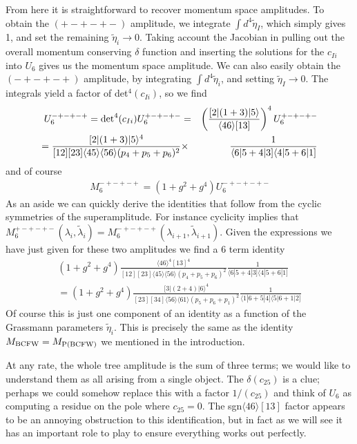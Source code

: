 \documentclass[12pt]{article}
\newcommand{\be}{\begin{eqnarray}}
\newcommand{\ee}{\end{eqnarray}}
\begin{document}
From here it is straightforward to recover momentum space amplitudes. To obtain the $(+-+-+-)$ amplitude, we integrate $\int d^4 \tilde \eta_I$, which simply gives 1, and set the remaining $\tilde \eta_i \to 0$. Taking account the Jacobian in pulling out the overall momentum conserving $\delta$ function and inserting the solutions for the $c_{Ii}$ into $U_6$ gives us the momentum space amplitude. We can also easily obtain the $(-+-+-+)$ amplitude, by integrating $\int d^4 \tilde \eta_i$, and setting $\tilde \eta_I \to 0$. The integrals yield a factor of det$^4(c_{Ii})$, so we find
\begin{eqnarray}
U_6^{-+-+-+} = {\rm det}^4(c_{Ii}) U_6^{+-+-+-}  &=& \left(\frac{[2|(1 + 3)|5 \rangle}{\langle 4 6 \rangle [1 3]}\right)^4 U_6^{+-+-+-} \nonumber \\ =
\frac{[2|(1+3)|5 \rangle^4}{[12][23]\langle 45 \rangle \langle 56 \rangle (p_4 + p_5 + p_6)^2}
&\times& \frac{1}{\langle 6 |5 + 4|3] \langle 4|5
 + 6 |1]}
\end{eqnarray}
and of course
\be
M_6^{-+-+-+} = (1 + g^2 + g^4) U_6^{-+-+-+-}
\ee
As an aside we can quickly derive the identities that follow from the cyclic symmetries of the superamplitude. For instance cyclicity implies that $M_6^{+-+-+-}(\lambda_i,\tilde \lambda_i) = M_6^{-+-+-+}(\lambda_{i+1}, \tilde \lambda_{i+1})$. Given the expressions we have just given for these two amplitudes we find a 6 term identity
\begin{eqnarray}
(1 + g^2 + g^4)  \frac{\langle 4 6 \rangle^4 [1 3]^4}{[12][23]\langle 45 \rangle \langle 56 \rangle (p_4 + p_5 + p_6)^2} \frac{1}{\langle 6 |5 + 4|3]
\langle 4|5 + 6 |1]} \nonumber \\ = (1 + g^2 + g^4) \frac{[3|(2+4)|6 \rangle^4}{[23][34]\langle 56 \rangle \langle 61 \rangle (p_5 + p_6 + p_1)^2}
\frac{1}{\langle 1 |6 + 5|4] \langle 5|6+ 1 |2]}
\end{eqnarray}
Of course this is just one component of an identity as a function of
the Grassmann parameters $\tilde \eta_i$. This is precisely the same
as the identity $M_{{\rm BCFW}} = M_{{\rm P(BCFW)}}$ we mentioned in
the introduction.

At any rate, the whole tree amplitude is the sum of three terms; we would like to understand them as all arising from a single object. The $\delta(c_{25})$ is a clue; perhaps we could somehow replace this with a factor $1/(c_{25})$ and think of $U_6$ as computing a residue on the pole where $c_{25} = 0$. The sgn$\langle 46 \rangle [13]$ factor appears to be an annoying obstruction to this identification, but in fact as we will see it has an important role to play to ensure everything works out perfectly.
\end{document}
